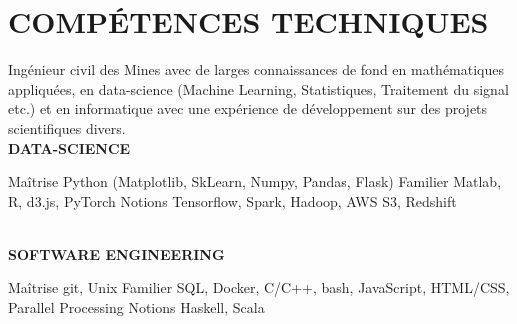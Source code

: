 \documentclass[]{cv-style}          %
\begin{document}
\section{COMPÉTENCES TECHNIQUES}
\vspace{-0.3cm}
%
Ingénieur civil des Mines avec de larges connaissances de fond en mathématiques appliquées, en data-science (Machine Learning, Statistiques, Traitement du signal etc.) et en informatique avec une expérience de développement sur des projets scientifiques divers. \\[0.1cm]
\textbf{DATA-SCIENCE} \\[0.1cm]
\begin{entrylist}
\entry
{Maîtrise}
{
{\normalfont Python (Matplotlib, SkLearn, Numpy, Pandas, Flask)}}{}{\vspace{-0.5cm}}
\entry
{Familier}
{
{\normalfont Matlab, R, d3.js, PyTorch}}{}{\vspace{-0.5cm}}
\entry
{Notions}
{
{\normalfont Tensorflow, Spark, Hadoop, AWS S3, Redshift}}{}{}
\end{entrylist}
\vspace{-0.5cm}\\
\textbf{SOFTWARE ENGINEERING} \\[0.1cm]
\begin{entrylist}
\entry
{Maîtrise}
{
{\normalfont git, Unix}}{}{\vspace{-0.5cm}}
\entry
{Familier}
{
{\normalfont SQL, Docker, C/C++, bash, JavaScript, HTML/CSS, Parallel Processing}}{}{\vspace{-0.5cm}}
\entry
{Notions}
{
{\normalfont Haskell, Scala}}{}{\vspace{-0.5cm}}
\end{entrylist}
%
%
%
\end{document}
